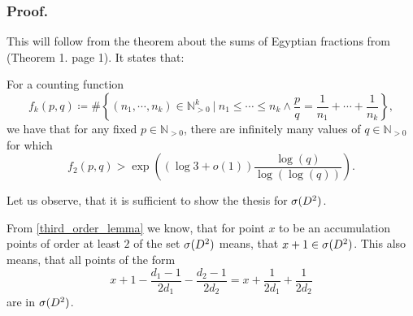 \subsubsection{Proof.}
This will follow from the theorem about the sums of Egyptian fractions from \cite{Browning2011} 
(Theorem 1. page 1).
It states that: 
\begin{theorem}
For a counting function
\begin{equation}
f_k(p,q) \coloneqq 
\#\left\{(n_1, \cdots, n_k)\in \mathbb{N}_{>0}^k\ \Big|\ n_1 \leq \cdots \leq n_k 
\land \frac{p}{q} = \frac{1}{n_1} + \cdots + \frac{1}{n_k}\right\},
\end{equation}
we have that for any fixed $p\in\mathbb{N}_{>0}$, there are infinitely many values of 
$q\in\mathbb{N}_{>0}$ for which
\begin{equation}
f_2(p,q) > \exp\left((\log{3}+o(1))\frac{\log(q)}{\log(\log(q))}\right).
\end{equation}
\end{theorem}

Let us observe, that it is sufficient to show the thesis for ${{\sigma}(D^2)}$.

From \ref{third_order_lemma} we know, that for point $x$ to be an accumulation points of order 
at least $2$ of the set ${{\sigma}(D^2)}$ means, that $x + 1 \in {{\sigma}(D^2)}$. This also means, that 
all points of the form 
\begin{equation}\label{pq condition}
x + 1 - \frac{d_1-1}{2d_1} - \frac{d_2-1}{2d_2} = x + \frac{1}{2d_1} + \frac{1}{2d_2}
\end{equation} 
are in ${{\sigma}(D^2)}$. 

